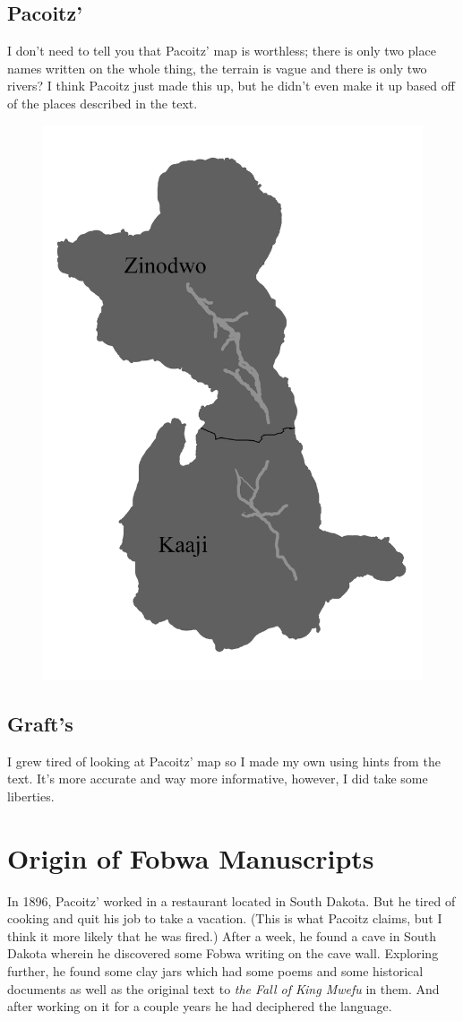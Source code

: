 \section{Pacoitz'}
I don't need to tell you that Pacoitz' map is worthless; there is only two place names written on the whole thing, the terrain is vague and there is only two rivers? I think Pacoitz just made this up, but he didn't even make it up based off of the places described in the text.
\begin{figure}[H]
\centering
\includegraphics[width=4.5in]{Twizwa_map2.png}
\end{figure}
\clearpage

\section{Graft's}
I grew tired of looking at Pacoitz' map so I made my own using hints from the text. It's more accurate and way more informative, however, I did take some liberties.

\chapter{Origin of Fobwa Manuscripts}
In 1896, Pacoitz' worked in a restaurant located in South Dakota. But he tired of cooking and quit his job to take a vacation. (This is what Pacoitz claims, but I think it more likely that he was fired.) After a week, he found a cave in South Dakota wherein he discovered some Fobwa writing on the cave wall. Exploring further, he found some clay jars which had some poems and some historical documents as well as the original text to \emph{the Fall of King Mwefu} in them. And after working on it for a couple years he had deciphered the language.

